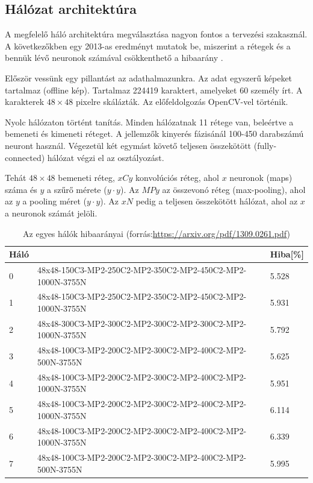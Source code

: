 \subsection{Hálózat architektúra}

A megfelelő háló architektúra megválasztása nagyon fontos a tervezési szakasznál. A következőkben egy 2013-as eredményt mutatok be, miszerint a rétegek és a bennük lévő neuronok számával csökkenthető a hibaarány \cite{cirecsan2015multi}.

Először vessünk egy pillantást az adathalmazunkra. Az adat egyszerű képeket tartalmaz (offline kép). Tartalmaz 224419 karaktert, amelyeket 60 személy írt. A karakterek $48 \times 48$ pixelre skálázták. Az előfeldolgozás OpenCV-vel történik.

Nyolc hálózaton történt tanítás. Minden hálózatnak 11 rétege van, beleértve a bemeneti és kimeneti réteget. A jellemzők kinyerés fázisánál 100-450 darabszámú neuront használ. Végezetül két egymást követő teljesen összekötött (fully-connected) hálózat végzi el az osztályozást.

Tehát $48 \times 48$ bemeneti réteg, $xCy$ konvolúciós réteg, ahol $x$ neuronok (maps) száma és $y$ a szűrő mérete ($y \cdot y$). Az $MPy$ az összevonó réteg (max-pooling), ahol az $y$ a pooling méret ($y \cdot y$). Az $xN$ pedig a teljesen összekötött hálózat, ahol az $x$ a neuronok számát jelöli.

\begin{table}[h]
\centering
\begin{tabular}{|l|l|l|}
\hline
 Háló &                                                                      & Hiba[\%] \\ \hline
0               & 48x48-150C3-MP2-250C2-MP2-350C2-MP2-450C2-MP2-1000N-3755N & 5.528 \\ \hline
1               & 48x48-150C3-MP2-250C2-MP2-350C2-MP2-450C2-MP2-1000N-3755N & 5.931 \\ \hline
2               & 48x48-300C3-MP2-300C2-MP2-300C2-MP2-300C2-MP2-1000N-3755N & 5.792 \\ \hline
3               & 48x48-100C3-MP2-200C2-MP2-300C2-MP2-400C2-MP2-500N-3755N  & 5.625 \\ \hline
4               & 48x48-100C3-MP2-200C2-MP2-300C2-MP2-400C2-MP2-1000N-3755N & 5.951 \\ \hline
5               & 48x48-100C3-MP2-200C2-MP2-300C2-MP2-400C2-MP2-1000N-3755N & 6.114 \\ \hline
6               & 48x48-100C3-MP2-200C2-MP2-300C2-MP2-400C2-MP2-1000N-3755N & 6.339 \\ \hline
7               & 48x48-100C3-MP2-200C2-MP2-300C2-MP2-400C2-MP2-500N-3755N  & 5.995 \\ \hline
\end{tabular}
\caption{Az egyes hálók hibaarányai (forrás:\url{https://arxiv.org/pdf/1309.0261.pdf})}
\label{tab:ann_result}
\end{table}

